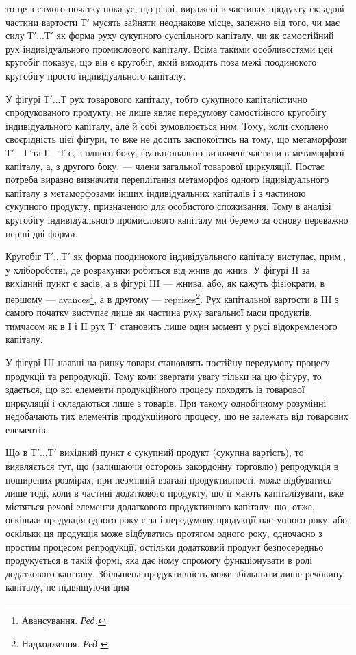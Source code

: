 \parcont{}  %
то це з самого початку показує, що різні, виражені в частинах продукту складові частини вартости $Т'$
мусять зайняти неоднакове місце, залежно від того, чи має силу $Т'... Т'$ як форма руху сукупного
суспільного капіталу, чи як самостійний рух індивідуального промислового капіталу. Всіма такими
особливостями цей кругобіг показує, що він є кругобіг, який виходить поза межі поодинокого кругобігу
просто індивідуального капіталу.

У фігурі $Т'... Т$ рух товарового капіталу, тобто сукупного капіталістично спродукованого продукту, не
лише являє передумову самостійного кругобігу індивідуального капіталу, але й собі зумовлюється ним.
Тому, коли схоплено своєрідність цієї фігури, то вже не досить заспокоїтись на тому, що метаморфози
$Т' — Г' т$а $Г — Т$ є, з одного боку, функціонально визначені частини в метаморфозі капіталу, а, з
другого боку, — члени загальної товарової циркуляції. Постає потреба виразно визначити переплітання
метаморфоз одного індивідуального капіталу з метаморфозами інших індивідуальних капіталів і з
частиною сукупного продукту, призначеною для особистого споживання. Тому в аналізі кругобігу
індивідуального промислового капіталу ми беремо за основу переважно перші дві форми.

Кругобіг $Т'... Т'$ як форма поодинокого індивідуального капіталу виступає, прим., у хліборобстві, де
розрахунки робиться від жнив до жнив. У фігурі II за вихідний пункт є засів, а в фігурі III — жнива,
або, як кажуть фізіократи, в першому — avances\footnote*{
Авансування. \emph{Ред.}
}, а в другому — reprises\footnote*{
Надходження. \emph{Ред.}
}. Рух капітальної
вартости в III з самого початку виступає лише як частина руху загальної маси продуктів, тимчасом як
в I і II рух $Т'$ становить лише один момент у русі відокремленого капіталу.

У фігурі III наявні на ринку товари становлять постійну передумову процесу продукції та репродукції.
Тому коли звертати увагу тільки на цю фігуру, то здається, що всі елементи продукційного процесу
походять із товарової циркуляції і складаються лише з товарів. При такому однобічному розумінні
недобачають тих елементів продукційного процесу, що не залежать від товарових елементів.

Що в $Т'... Т'$ вихідний пункт є сукупний продукт (сукупна вартість), то виявляється тут, що
(залишаючи осторонь закордонну торговлю) репродукція в поширених розмірах, при незмінній взагалі
продуктивності, може відбуватись лише тоді, коли в частині додаткового продукту, що її мають
капіталізувати, вже містяться речові елементи додаткового продуктивного капіталу; що, отже, оскільки
продукція одного року є за і передумову продукції наступного року, або оскільки ця продукція може
відбуватись протягом одного року, одночасно з простим процесом репродукції, остільки додатковий
продукт безпосередньо продукується в такій формі, яка дає йому спромогу функціонувати в ролі
додаткового капіталу. Збільшена продуктивність може збільшити лише речовину капіталу, не підвищуючи
цим
\parbreak{}  %
